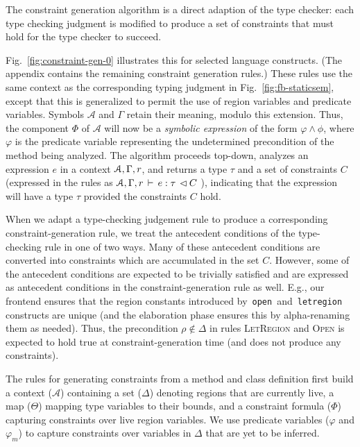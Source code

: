 \documentclass[a4paper,UKenglish]{lipics-v2018}
\newcommand{\C}[1]{\code{#1}}
\newcommand{\code}[1]{\,{\tt #1}\,}
\newcommand{\conj}{\wedge}
\newcommand{\env}[0]{\Gamma}
\newcommand{\rhoenv}{\Delta}
\newcommand{\aenv}{\Theta}
\newcommand{\phicx}{\Phi}
\newcommand{\A}{{\mathcal{A}}}
\begin{document}
 The constraint generation algorithm is
a direct adaption of the type checker: each type checking judgment is
modified to produce a set of constraints that must hold for the type
checker to succeed.

Fig.~\ref{fig:constraint-gen-0} illustrates this for selected language
constructs.  (The appendix contains the remaining constraint
generation rules.) These rules use the same context as the
corresponding typing judgment in Fig.~\ref{fig:fb-staticsem}, except
that this is generalized to permit the use of region variables and
predicate variables.  Symbols $\A$ and $\env$ retain their meaning,
modulo this extension.  Thus, the component $\phicx$ of $\A$ will now
be a \emph{symbolic expression} of the form $\varphi \conj \phi$,
where $\varphi$ is the predicate variable representing the
undetermined precondition of the method being analyzed.  The algorithm
proceeds top-down, analyzes an expression $e$ in a context
$\stdcontext$, and returns a type $\tau$ and a set of constraints $C$
(expressed in the rules as $\exprok {\stdcontext} {e} {\tau} {C}$ ),
indicating that the expression will have a type $\tau$ provided the
constraints $C$ hold.

When we adapt a type-checking judgement rule to produce a
corresponding constraint-generation rule, we treat the antecedent
conditions of the type-checking rule in one of two ways. Many of these
antecedent conditions are converted into constraints which are
accumulated in the set $C$. However, some of the antecedent conditions
are expected to be trivially satisfied and are expressed as antecedent
conditions in the constraint-generation rule as well.  E.g., our
frontend ensures that the region constants introduced by \C{open} and
\C{letregion} constructs are unique (and the elaboration phase ensures
this by alpha-renaming them as needed). Thus, the precondition $\rho
\not\in \Delta$ in rules \textsc{LetRegion} and \textsc{Open} is
expected to hold true at constraint-generation time (and does not
produce any constraints).

The rules for generating constraints from a method and class
definition first build a context ($\A$) containing a set ($ \rhoenv$)
denoting regions that are currently live, a map ($\aenv$) mapping type
variables to their bounds, and a constraint formula ($\phicx$)
capturing constraints over live region variables. We use predicate
variables ($\varphi$ and $\varphi_m$) to capture constraints over
variables in $\rhoenv$ that are yet to be inferred.
\end{document}
